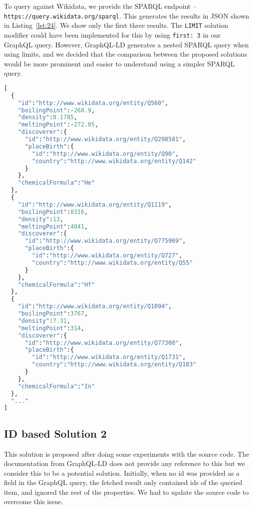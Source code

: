 To query against Wikidata, we provide the SPARQL endpoint – \texttt{https://query.wikidata.org/sparql}. This generates the results in JSON shown in Listing~\ref{lst:24}. We show only the first three results. The \texttt{LIMIT} solution modifier could have been implemented for this by using \texttt{first: 3} in our GraphQL query. However, GraphQL-LD generates a nested SPARQL query when using limits, and we decided that the comparison between the proposed solutions would be more prominent and easier to understand using a simpler SPARQL query.


\begin{minipage}{\linewidth}
\begin{lstlisting}[label=lst:24, caption={Results obtained}, language=GraphQL]
[
  {
    "id":"http://www.wikidata.org/entity/Q560",
    "boilingPoint":-268.9,
    "density":0.1785,
    "meltingPoint":-272.05,
    "discoverer":{
      "id":"http://www.wikidata.org/entity/Q298581",
      "placeBirth":{
        "id":"http://www.wikidata.org/entity/Q90",
        "country":"http://www.wikidata.org/entity/Q142"
      }
    },
    "chemicalFormula":"He"
  },
  {
    "id":"http://www.wikidata.org/entity/Q1119",
    "boilingPoint":8316,
    "density":13,
    "meltingPoint":4041,
    "discoverer":{
      "id":"http://www.wikidata.org/entity/Q775969",
      "placeBirth":{
        "id":"http://www.wikidata.org/entity/Q727",
        "country":"http://www.wikidata.org/entity/Q55"
      }
    },
    "chemicalFormula":"Hf"
  },
  {
    "id":"http://www.wikidata.org/entity/Q1094",
    "boilingPoint":3767,
    "density":7.31,
    "meltingPoint":314,
    "discoverer":{
      "id":"http://www.wikidata.org/entity/Q77308",
      "placeBirth":{
        "id":"http://www.wikidata.org/entity/Q1731",
        "country":"http://www.wikidata.org/entity/Q183"
      }
    },
    "chemicalFormula":"In"
  },
  "..."
]
\end{lstlisting}
\end{minipage}

\subsection{ID based Solution 2}

This solution is proposed after doing some experiments with the source code. The documentation from GraphQL-LD does not provide any reference to this but we consider this to be a potential solution. Initially, when no id was provided as a field in the GraphQL query, the fetched result only contained ids of the queried item, and ignored the rest of the properties. We had to update the source code to overcome this issue.

